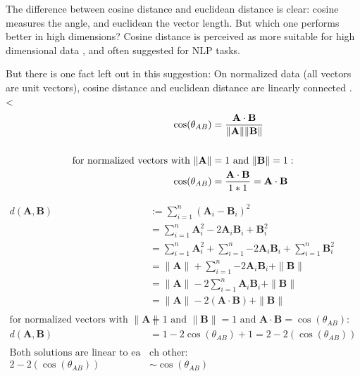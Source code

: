 		The difference between cosine distance and euclidean distance is clear: cosine measures the angle, and euclidean the vector length. But which one performs better in high dimensions? Cosine distance is perceived as more suitable for high dimensional data \cite[c.2.1.2.1]{40algorithms}, and often suggested for \ac{NLP} tasks. 
		
		But there is one fact left out in this suggestion: On normalized data (all vectors are unit vectors), cosine distance and euclidean distance are linearly connected \cite{khanRelationshipCosineSimilarity2020}.
		<
		\begin{align*}
			\cos(\theta_{AB}) &= {\mathbf{A} \cdot \mathbf{B} \over \|\mathbf{A}\| \|\mathbf{B}\|}  \\
			\\
			\text{for normalized vectors with } \|\mathbf{A}\| &=1 \text{ and } \|\mathbf{B}\| =1: \\
			\cos(\theta_{AB}) &=  {\mathbf{A} \cdot \mathbf{B} \over 1 * 1 } = \mathbf{A} \cdot \mathbf{B}
		\end{align*}
		
		\begin{align*}
			d(\mathbf{A}, \mathbf{B}) &:=  \sum\limits_{i=1}^{n}{(\mathbf{A}_i -  \mathbf{B}_i)^{2}} \\
			&= \sum\limits_{i=1}^{n}{\mathbf{A}_i^{2} - 2\mathbf{A}_i\mathbf{B}_i + \mathbf{B}_i^2}  \\ 
			&= \sum\limits_{i=1}^{n}{\mathbf{A}_i^{2}} + \sum\limits_{i=1}^{n}{- 2\mathbf{A}_i\mathbf{B}_i} + \sum\limits_{i=1}^{n}{\mathbf{B}_i^2} \\
			&= 	\|\mathbf{A}\| + \sum\limits_{i=1}^{n}{- 2\mathbf{A}_i\mathbf{B}_i} + \|\mathbf{B}\| \\
			&= \|\mathbf{A}\| -2 \sum\limits_{i=1}^{n}{\mathbf{A}_i\mathbf{B}_i} + \|\mathbf{B}\| \\
			&= \|\mathbf{A}\| -2 (\mathbf{A} \cdot \mathbf{B}) + \|\mathbf{B}\| \\
			\\
			\text{for normalized vectors with }\|\mathbf{A}\| &=1 \text{ and } \|\mathbf{B}\| =1  \text{ and } \mathbf{A} \cdot \mathbf{B}  = \cos(\theta_{AB}):\\
			d(\mathbf{A}, \mathbf{B}) &= 1 - 2 \cos(\theta_{AB}) + 1 = 2 - 2(\cos(\theta_{AB})) \\
			\\
			\text{Both solutions are linear to ea}& \text{ch other:} \\
			2 - 2(\cos(\theta_{AB})) &\sim \cos(\theta_{AB})
		\end{align*}
	
